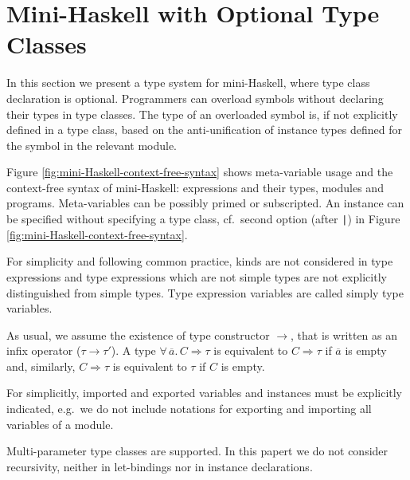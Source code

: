 \section{Mini-Haskell with Optional Type Classes}
\label{Optional-type-classes}

In this section we present a type system for mini-Haskell, where type
class declaration is optional. Programmers can overload symbols
without declaring their types in type classes. The type of an
overloaded symbol is, if not explicitly defined in a type class, based
on the anti-unification of instance types defined for the symbol in
the relevant module.

Figure \ref{fig:mini-Haskell-context-free-syntax} shows meta-variable
usage and the context-free syntax of mini-Haskell: expressions and
their types, modules and programs. Meta-variables can be possibly
primed or subscripted. An instance can be specified without specifying
a type class, cf.~second option (after {\tt |}) in Figure
\ref{fig:mini-Haskell-context-free-syntax}.


For simplicity and following common practice, kinds are not considered
in type expressions and type expressions which are not simple types
are not explicitly distinguished from simple types. Type expression
variables are called simply type variables. 

As usual, we assume the existence of type constructor $\to$, that is
written as an infix operator ($\tau \to \tau'$). A type
$\forall\,\overline{a}.\,C\Rightarrow \tau$ is equivalent to
$C\Rightarrow \tau$ if $\overline{a}$ is empty and, similarly,
$C\Rightarrow \tau$ is equivalent to $\tau$ if $C$ is empty.

For simplicitly, imported and exported variables and instances must be
explicitly indicated, e.g.~we do not include notations for exporting
and importing all variables of a module.

Multi-parameter type classes are supported. In this papert we do not
consider recursivity, neither in let-bindings nor in instance
declarations. 

